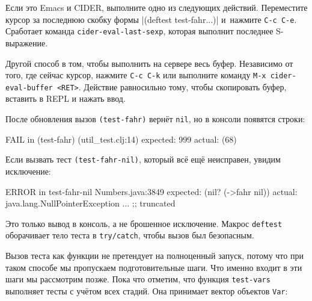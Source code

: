 
Если это Emacs и CIDER, выполните одно из следующих действий. Переместите курсор
за последнюю скобку формы \spverb|(deftest test-fahr...)| и~нажмите
\verb|C-c C-e|. Сработает команда \texttt{cider\--eval-last-sexp}, которая
выполнит последнее S-выражение.

Другой способ в том, чтобы выполнить на сервере весь буфер. Независимо от того,
где сейчас курсор, нажмите \verb|C-c C-k| или выполните команду
\verb|M-x cider-eval-buffer <RET>|. Действие равносильно тому, чтобы скопировать
буфер, вставить в REPL и нажать ввод.

После обновления вызов \verb|(test-fahr)| вернёт \verb|nil|, но в консоли
появятся строки:

\begin{english}
  \begin{clojure}
FAIL in (test-fahr) (util_test.clj:14)
expected: 999
  actual: (68)
  \end{clojure}
\end{english}

Если вызвать тест \verb|(test-fahr-nil)|, который всё ещё неисправен,
увидим исключение:

\ifx\DEVICETYPE\MOBILE

\begin{english}
  \begin{clojure}
ERROR in test-fahr-nil Numbers.java:3849
expected: (nil? (->fahr nil))
  actual: java.lang.NullPointerException
    ... ;; truncated
  \end{clojure}
\end{english}

\else

\begin{english}
\end{english}

\fi

Это только вывод в консоль, а не брошенное исключение. Макрос \verb|deftest|
оборачивает тело теста в \verb|try/catch|, чтобы вызов был безопасным.

Вызов теста как функции не претендует на полноценный запуск, потому что при
таком способе мы пропускаем подготовительные шаги. Что именно входит в эти шаги
мы рассмотрим позже. Пока что отметим, что функция \verb|test-vars| выполняет
тесты с учётом всех стадий. Она принимает вектор объектов \verb|Var|:

